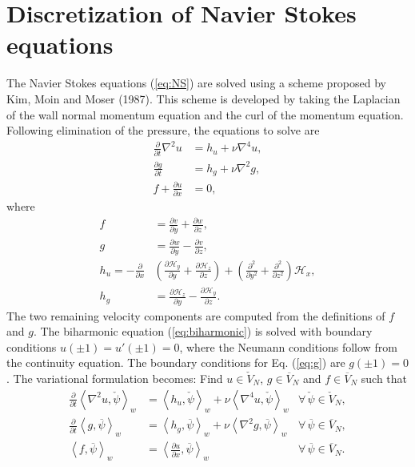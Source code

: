 \documentclass[preprint]{elsarticle}
\newcommand{\N}[1]{\check{#1}}
\newcommand{\D}[1]{\overline{#1}}
\begin{document}
\section{Discretization of Navier Stokes equations}
\label{sec:discretizationNS}
The Navier Stokes equations (\ref{eq:NS}) are solved using a scheme 
proposed by Kim, Moin and Moser (1987). This scheme is developed by taking the 
Laplacian of the wall normal momentum equation and the curl of the momentum 
equation. Following elimination of the pressure, the equations to solve are 
\begin{align}
\frac{\partial}{\partial t} \nabla^2 u &= h_u + \nu \nabla^4 u, 
\label{eq:biharmonic} \\
\frac{\partial g}{\partial t} &= h_g + \nu \nabla^2 g, \label{eq:g} \\
f + \frac{\partial u}{\partial x} &= 0, \label{eq:f}
\end{align}
where
\begin{align}
f &= \frac{\partial v}{\partial y} + \frac{\partial w}{\partial z}, \\
g &= \frac{\partial w}{\partial y} - \frac{\partial v}{\partial z}, \\
h_u = -\frac{\partial}{\partial x} &\left( \frac{\partial 
\mathcal{H}_y}{\partial y} + \frac{\partial \mathcal{H}_z}{\partial z} \right) 
+ \left(\frac{\partial^2}{\partial y^2} + \frac{\partial^2}{\partial z^2} 
\right) \mathcal{H}_x ,
\\
h_g &= \frac{\partial \mathcal{H}_z}{\partial y} - \frac{\partial 
\mathcal{H}_y}{\partial z}.
\end{align}
The two remaining velocity components are computed from the definitions of $f$ 
and $g$. The biharmonic equation (\ref{eq:biharmonic}) is solved with boundary 
conditions $u(\pm 1) = u'(\pm 1) = 0$, where the Neumann conditions follow 
from the continuity equation. The boundary conditions for Eq. (\ref{eq:g}) are 
$g(\pm 1) = 0$. The variational formulation becomes: Find ${u} \in 
\N{V}_N$, ${g} \in \D{V}_N$ and ${f} \in \D{V}_N$ such that
\begin{align}
	\frac{\partial }{\partial t} \left< \nabla^2 u, \N{\psi}\right>_w &= 
	\left<h_u, \N{\psi} \right>_w + \nu \left<\nabla^4u, \N{\psi}\right>_w 
	&\forall \,\N{\psi} \in \N{V}_N, \label{eq:u1} \\
	\frac{\partial}{\partial t}\left<g, \D{\psi}\right>_w &= \left<h_g, 
	\D{\psi}\right>_w + \nu 
	\left<\nabla^2 g, \D{\psi}\right>_w &\forall \, \D{\psi} \in \D{V}_N ,
	\label{eq:g1} \\
	\left<f, \D{\psi}\right>_w &= \left<\frac{\partial u}{\partial x}, 
	\D{\psi}\right>_w &\forall \, \D{\psi} \in \D{V}_N. \label{eq:f1}
\end{align}
\end{document}
